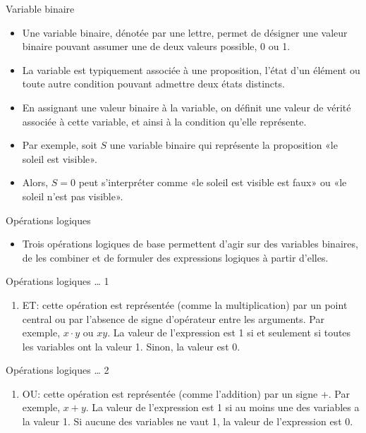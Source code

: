 \documentclass[presentation]{beamer}
\begin{document}
\begin{frame}[label={sec:orgb04b3f3}]{Variable binaire}
\begin{itemize}
\item Une variable binaire, dénotée par une lettre, permet de désigner une valeur binaire pouvant assumer une de deux valeurs possible, 0 ou 1.

\item La variable est typiquement associée à une proposition, l'état d'un élément ou toute autre condition pouvant admettre deux états distincts.

\item En assignant une valeur binaire à la variable, on définit une valeur de vérité associée à cette variable, et ainsi à la condition qu'elle représente.

\item Par exemple, soit \(S\) une variable binaire qui représente la proposition «le soleil est visible».

\item Alors, \(S=0\) peut s'interpréter comme «le soleil est visible est faux» ou «le soleil n'est pas visible».
\end{itemize}
\end{frame}

\begin{frame}[label={sec:orgff4bdc4}]{Opérations logiques}
\begin{itemize}
\item Trois opérations logiques de base permettent d'agir sur des variables binaires, de les combiner et de formuler des expressions logiques à partir d'elles.
\end{itemize}
\end{frame}


\begin{frame}[label={sec:org07168ff}]{Opérations logiques \ldots{} 1}
\begin{enumerate}
\item ET: cette opération est représentée (comme la multiplication) par
un point central ou par l'absence de signe d'opérateur entre les
arguments.  Par exemple, \(x \cdot y\) ou \(x y\).  La valeur de
l'expression est 1 si et seulement si toutes les variables ont la
valeur 1. Sinon, la valeur est 0.
\end{enumerate}
\end{frame}

\begin{frame}[label={sec:org9049a5a}]{Opérations logiques \ldots{} 2}
\begin{enumerate}
\item OU: cette opération est représentée (comme l'addition) par un signe
+. Par exemple, \(x + y\). La valeur de l'expression est 1 si au
moins une des variables a la valeur 1. Si aucune des variables ne
vaut 1, la valeur de l'expression est 0.
\end{enumerate}
\end{frame}
\end{document}
